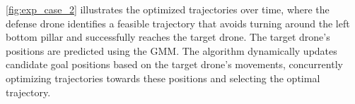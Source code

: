 






\cref{fig:exp_case_2} illustrates the optimized trajectories over time, where the defense drone identifies a feasible trajectory that avoids turning around the left bottom pillar and successfully reaches the target drone.
The target drone's positions are predicted using the GMM.
The algorithm dynamically updates candidate goal positions based on the target drone's movements, concurrently optimizing trajectories towards these positions and selecting the optimal trajectory.

